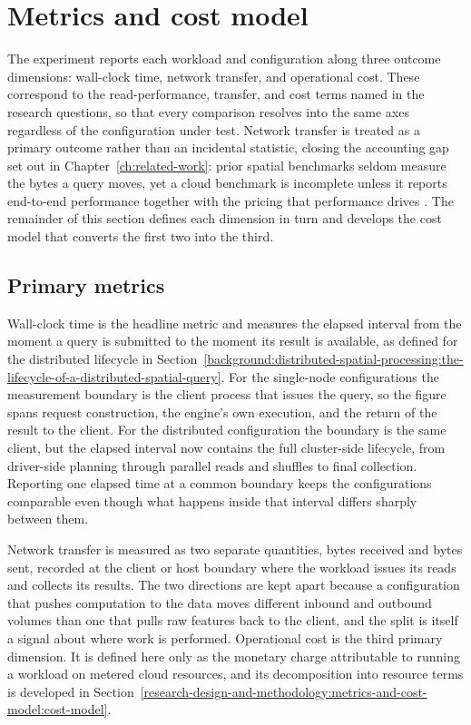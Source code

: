 \section{Metrics and cost model}
\label{research-design-and-methodology:metrics-and-cost-model}

The experiment reports each workload and configuration along three outcome dimensions: wall-clock time, network transfer, and operational cost. These correspond to the read-performance, transfer, and cost terms named in the research questions, so that every comparison resolves into the same axes regardless of the configuration under test. Network transfer is treated as a primary outcome rather than an incidental statistic, closing the accounting gap set out in Chapter~\ref{ch:related-work}: prior spatial benchmarks seldom measure the bytes a query moves, yet a cloud benchmark is incomplete unless it reports end-to-end performance together with the pricing that performance drives \parencite{folkerts2012_benchmarking_in_the_cloud}. The remainder of this section defines each dimension in turn and develops the cost model that converts the first two into the third.

\subsection{Primary metrics}
\label{research-design-and-methodology:metrics-and-cost-model:primary-metrics}

Wall-clock time is the headline metric and measures the elapsed interval from the moment a query is submitted to the moment its result is available, as defined for the distributed lifecycle in Section~\ref{background:distributed-spatial-processing:the-lifecycle-of-a-distributed-spatial-query}. For the single-node configurations the measurement boundary is the client process that issues the query, so the figure spans request construction, the engine's own execution, and the return of the result to the client. For the distributed configuration the boundary is the same client, but the elapsed interval now contains the full cluster-side lifecycle, from driver-side planning through parallel reads and shuffles to final collection. Reporting one elapsed time at a common boundary keeps the configurations comparable even though what happens inside that interval differs sharply between them.

Network transfer is measured as two separate quantities, bytes received and bytes sent, recorded at the client or host boundary where the workload issues its reads and collects its results. The two directions are kept apart because a configuration that pushes computation to the data moves different inbound and outbound volumes than one that pulls raw features back to the client, and the split is itself a signal about where work is performed. Operational cost is the third primary dimension. It is defined here only as the monetary charge attributable to running a workload on metered cloud resources, and its decomposition into resource terms is developed in Section~\ref{research-design-and-methodology:metrics-and-cost-model:cost-model}.

